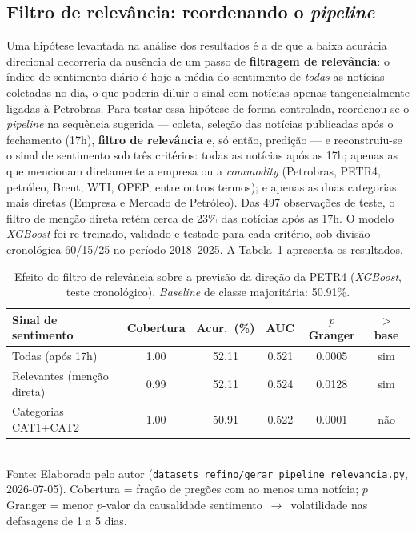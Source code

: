 \subsection{Filtro de relevância: reordenando o \textit{pipeline}}
\label{sec:filtro_relevancia}

Uma hipótese levantada na análise dos resultados é a de que a baixa acurácia direcional
decorreria da ausência de um passo de \textbf{filtragem de relevância}: o índice de sentimento
diário é hoje a média do sentimento de \emph{todas} as notícias coletadas no dia, o que poderia
diluir o sinal com notícias apenas tangencialmente ligadas à Petrobras. Para testar essa hipótese
de forma controlada, reordenou-se o \textit{pipeline} na sequência sugerida --- coleta, seleção das
notícias publicadas após o fechamento (17h), \textbf{filtro de relevância} e, só então, predição ---
e reconstruiu-se o sinal de sentimento sob três critérios: todas as notícias após as 17h; apenas as
que mencionam diretamente a empresa ou a \textit{commodity} (Petrobras, PETR4, petróleo, Brent, WTI,
OPEP, entre outros termos); e apenas as duas categorias mais diretas (Empresa e Mercado de Petróleo).
Das 497 observações de teste, o filtro de menção direta
retém cerca de 23\% das notícias após as 17h. O modelo \textit{XGBoost} foi re-treinado, validado e
testado para cada critério, sob divisão cronológica 60/15/25 no período 2018--2025. A
Tabela~\ref{tab:filtro_relevancia} apresenta os resultados.

\begin{table}[htpb]
\centering
\caption{Efeito do filtro de relevância sobre a previsão da direção da PETR4 (\textit{XGBoost}, teste cronológico). \textit{Baseline} de classe majoritária: 50.91\%.}
\label{tab:filtro_relevancia}
\begin{tabular}{l c c c c c}
\hline
\textbf{Sinal de sentimento} & \textbf{Cobertura} & \textbf{Acur.\ (\%)} & \textbf{AUC} & \textbf{$p$ Granger} & \textbf{$>$ base} \\ \hline
Todas (após 17h) & 1.00 & 52.11 & 0.521 & 0.0005 & sim \\
Relevantes (menção direta) & 0.99 & 52.11 & 0.524 & 0.0128 & sim \\
Categorias CAT1+CAT2 & 1.00 & 50.91 & 0.522 & 0.0001 & não \\
\hline
\end{tabular}
\vspace{0.2cm}
{\small \\ Fonte: Elaborado pelo autor (\texttt{datasets\_refino/gerar\_pipeline\_relevancia.py}, 2026-07-05). Cobertura = fração de pregões com ao menos uma notícia; $p$ Granger = menor $p$-valor da causalidade sentimento~$\rightarrow$~volatilidade nas defasagens de 1 a 5 dias.}
\end{table}

